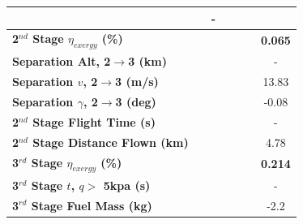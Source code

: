 \begin{table}[ht!]
\begin{tabular}{l c c c c c c}
		& \firstsecondSeparationgammaIspOneHundredTenNoReturn
		& -
		\\
		\hline 
		\textbf{2$^{nd}$ Stage $\eta_{exergy}$ (\%)}
		& \textbf{\secondExergyEffIspNinetyNoReturn}
		& \textbf{\secondExergyEffIspNinetyFiveNoReturn}
		& \textbf{\secondExergyEffIspStandardNoReturn}
		& \textbf{\secondExergyEffIspOneHundredFiveNoReturn}
		& \textbf{\secondExergyEffIspOneHundredTenNoReturn}
		& \textbf{0.065}
		\\
		\textbf{Separation Alt, 2$\rightarrow$3 (km)}
		& \secondthirdSeparationAltIspNinetyNoReturn
		& \secondthirdSeparationAltIspNinetyFiveNoReturn
		& \secondthirdSeparationAltIspStandardNoReturn
		& \secondthirdSeparationAltIspOneHundredFiveNoReturn
		& \secondthirdSeparationAltIspOneHundredTenNoReturn
		& -
		\\
		\textbf{Separation $v$, 2$\rightarrow$3 (m/s)}
		& \secondthirdSeparationvIspNinetyNoReturn
		& \secondthirdSeparationvIspNinetyFiveNoReturn
		& \secondthirdSeparationvIspStandardNoReturn
		& \secondthirdSeparationvIspOneHundredFiveNoReturn
		& \secondthirdSeparationvIspOneHundredTenNoReturn
		&13.83
		\\
		\textbf{Separation $\gamma$, 2$\rightarrow$3 (deg)}
		& \secondthirdSeparationgammaIspNinetyNoReturn
		& \secondthirdSeparationgammaIspNinetyFiveNoReturn
		& \secondthirdSeparationgammaIspStandardNoReturn
		& \secondthirdSeparationgammaIspOneHundredFiveNoReturn
		& \secondthirdSeparationgammaIspOneHundredTenNoReturn
		&-0.08
		\\
		\textbf{2$^{nd}$ Stage Flight Time (s)}
		& \secondFlightTimeIspNinetyNoReturn
		& \secondFlightTimeIspNinetyFiveNoReturn
		& \secondFlightTimeIspStandardNoReturn
		& \secondFlightTimeIspOneHundredFiveNoReturn
		& \secondFlightTimeIspOneHundredTenNoReturn
		& -
		\\
		\textbf{2$^{nd}$ Stage Distance Flown (km)}
		& \SecondDistIspNinetyNoReturn
		& \SecondDistIspNinetyFiveNoReturn
		& \SecondDistIspStandardNoReturn
		& \SecondDistIspOneHundredFiveNoReturn
		& \SecondDistIspOneHundredTenNoReturn
		&4.78
		\\
		\hline 
		\textbf{3$^{rd}$ Stage $\eta_{exergy}$ (\%)}
		& \textbf{\thirddExergyEffIspNinetyNoReturn}
		& \textbf{\thirddExergyEffIspNinetyFiveNoReturn}
		& \textbf{\thirddExergyEffIspStandardNoReturn}
		& \textbf{\thirddExergyEffIspOneHundredFiveNoReturn}
		& \textbf{\thirddExergyEffIspOneHundredTenNoReturn}
		& \textbf{0.214}
		\\
		\textbf{3$^{rd}$ Stage $t$, $q >$ 5kpa (s)}
		& \thirdqOverFiveIspNinetyNoReturn
		& \thirdqOverFiveIspNinetyFiveNoReturn
		& \thirdqOverFiveIspStandardNoReturn
		& \thirdqOverFiveIspOneHundredFiveNoReturn
		& \thirdqOverFiveIspOneHundredTenNoReturn
		& -
		\\
		\textbf{3$^{rd}$ Stage Fuel Mass (kg)}
		& \thirdmFuelIspNinetyNoReturn
		& \thirdmFuelIspNinetyFiveNoReturn
		& \thirdmFuelIspStandardNoReturn
		& \thirdmFuelIspOneHundredFiveNoReturn
		& \thirdmFuelIspOneHundredTenNoReturn
		&-2.2
		\\
		\hline 
	\end{tabular} 


\end{table}
